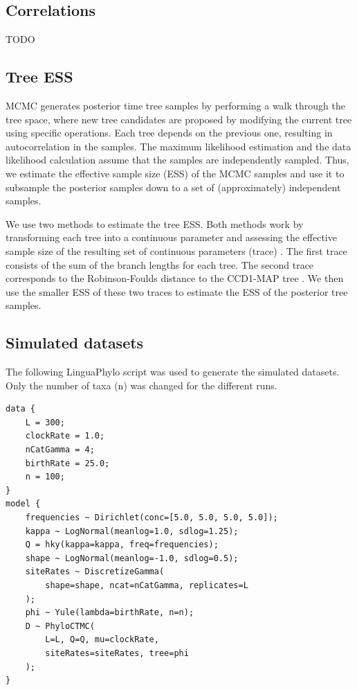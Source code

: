 \documentclass[10pt,letterpaper]{article}
\begin{document}
\subsection*{Correlations}


TODO

\subsection*{Tree ESS}

MCMC generates posterior time tree samples by performing a walk through the tree space, where new tree candidates are proposed by modifying the current tree using specific operations. Each tree depends on the previous one, resulting in autocorrelation in the samples. The maximum likelihood estimation and the data likelihood calculation assume that the samples are independently sampled. Thus, we estimate the effective sample size (ESS) of the MCMC samples and use it to subsample the posterior samples down to a set of (approximately) independent samples.

We use two methods to estimate the tree ESS. Both methods work by transforming each tree into a continuous parameter and assessing the effective sample size of the resulting set of continuous parameters (trace) \cite{treeess,vehtari2021rank}. The first trace consists of the sum of the branch lengths for each tree. The second trace corresponds to the Robinson-Foulds distance to the CCD1-MAP tree \cite{ccd}. We then use the smaller ESS of these two traces to estimate the ESS of the posterior tree samples.

\subsection*{Simulated datasets}

The following LinguaPhylo \cite{linguaphylo} script was used to generate the simulated datasets. Only the number of taxa (n) was changed for the different runs.

\begin{lstlisting}[basicstyle=\small]
data {
	L = 300;
	clockRate = 1.0;
	nCatGamma = 4;
	birthRate = 25.0;
	n = 100;
}
model {
	frequencies ~ Dirichlet(conc=[5.0, 5.0, 5.0, 5.0]);
	kappa ~ LogNormal(meanlog=1.0, sdlog=1.25);
	Q = hky(kappa=kappa, freq=frequencies);
	shape ~ LogNormal(meanlog=-1.0, sdlog=0.5);
	siteRates ~ DiscretizeGamma(
		shape=shape, ncat=nCatGamma, replicates=L
	);
	phi ~ Yule(lambda=birthRate, n=n);
	D ~ PhyloCTMC(
		L=L, Q=Q, mu=clockRate,
		siteRates=siteRates, tree=phi
	);
}
\end{lstlisting}
\end{document}
